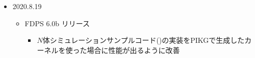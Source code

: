 \begin{itemize}[leftmargin=*,itemsep=-1ex]
\item 2020.8.19
\begin{itemize}
\item FDPS 6.0b リリース
\begin{itemize}
\item $N$体シミュレーションサンプルコード()の実装をPIKGで生成したカーネルを使った場合に性能が出るように改善
\end{itemize}
\end{itemize}


\end{itemize}
